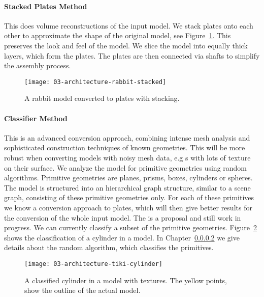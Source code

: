 \documentclass[../ClassicThesis.tex]{subfiles}
\begin{document}
\paragraph{Stacked Plates Method}

This \class{\fabmethod} does volume reconstructions of the
input model. We stack plates onto each other to approximate
the shape of the original model, see
Figure~\ref{fig:stacked-rabbit}. This preserves the look and
feel of the model. We slice the model into equally thick
layers, which form the plates. The plates are then connected
via shafts to simplify the assembly process.

\begin{figure}[h]
  \centering
  \texttt{[image: 03-architecture-rabbit-stacked]}
  \caption{A rabbit model converted to plates with
    stacking.}
  \label{fig:stacked-rabbit}
\end{figure}

\paragraph{Classifier Method}

This is an advanced conversion approach, combining intense
mesh analysis and sophisticated construction techniques of
known geometries. This \class{\fabmethod} will be more
robust when converting models with noisy mesh data, e.g
{\threedmodel}s with lots of texture on their surface. We
analyze the model for primitive geometries using random
algorithms. Primitive geometries are planes, prisms, boxes,
cylinders or spheres. The model is structured into an
hierarchical graph structure, similar to a scene graph,
consisting of these primitive geometries only. For each of
these primitives we know a conversion approach to plates,
which will then give better results for the conversion of
the whole input model. The  is a
proposal and still work in progress. We can currently
classify a subset of the primitive geometries.
Figure~\ref{fig:tiki-cylinder} shows the classification of a
cylinder in a model. In Chapter~\ref{}  we give details about the random algorithm,
which classifies the primitives.

\begin{figure}[h]
  \centering
  \texttt{[image: 03-architecture-tiki-cylinder]}
  \caption{A classified cylinder in a model with textures.
    The yellow points, show the outline of the actual model.}
  \label{fig:tiki-cylinder}
\end{figure}
\end{document}

